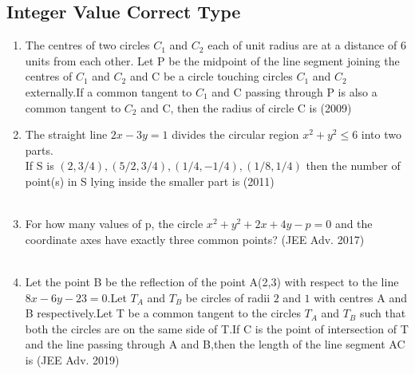 \documentclass[journal,12pt,twocolumn]{IEEEtran}
\theoremstyle{remark}
\begin{document}
\subsection{Integer Value Correct Type}
\begin{enumerate}
\item The centres of two circles $C_1$ and $C_2$ each of unit radius are at a distance of 6 units from each other. Let P be the midpoint of the line segment joining the centres of $C_1$ and $C_2$ and C be a circle touching circles $C_1$ and $C_2$ externally.If a common tangent to $C_1$ and C passing through P is also a common tangent to $C_2$ and C, then the radius of circle C is \hfill{(2009)}\\
\item The straight line $2x-3y=1$ divides the circular region $x^2+y^2\leq6$ into two parts.\\
If S is {$(2,3/4),(5/2,3/4),(1/4,-1/4),(1/8,1/4)$} then the  number of point(s) in S lying inside the smaller part is \hfill{(2011)}\\
\\
\item For how many values of p, the circle $x^2+y^2+2x+4y-p=0$ and the coordinate axes have exactly three common points? \hfill{(JEE Adv. 2017)}\\
\\
\item Let the point B be the reflection of the point A(2,3) with respect to the line $8x-6y-23=0$.Let $T_A$ and $T_B$ be circles of radii $2$ and $1$ with centres A and B respectively.Let T be a common tangent to the circles $T_A$ and $T_B$ such that both the circles are on the same side of T.If C is the point of intersection of T and the line passing through A and B,then the length of the line segment AC is \hfill{(JEE Adv. 2019)}
\end{enumerate}
\end{document}
